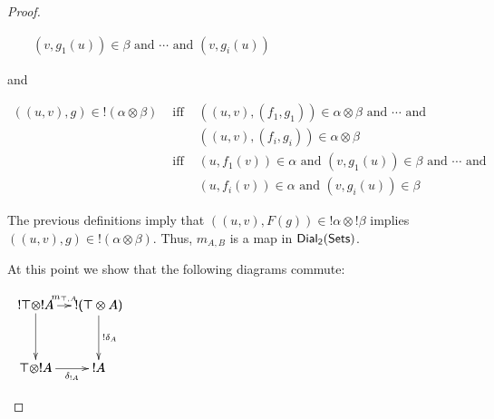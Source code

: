 \begin{proof}
\begin{center}
\begin{itemize}
\begin{center}
\begin{math}
\begin{array}{lll}
            &              & (v,g_1(u)) \in \beta \text{ and } \cdots \text{ and } (v,g_i(u)) 
          \end{array}
        \end{math}
      \end{center}
      and
      \begin{center}
        \begin{math}
          \begin{array}{lll}
            ((u,v),g) \in !(\alpha \otimes \beta) 
            & \text{ iff } & ((u,v),(f_1,g_1)) \in \alpha \otimes \beta \text{ and } \cdots \text{ and } \\
            &              & ((u,v),(f_i,g_i)) \in \alpha \otimes \beta\\
            & \text{ iff } & (u,f_1(v)) \in \alpha \text{ and } (v,g_1(u)) \in \beta \text{ and } \cdots \text{ and } \\
            &              & (u,f_i(v)) \in \alpha \text{ and } (v,g_i(u)) \in \beta
          \end{array}
        \end{math}
      \end{center}
      The previous definitions imply that
      $((u,v),F(g)) \in !\alpha \otimes !\beta$ implies
      $((u,v),g) \in !(\alpha \otimes \beta)$.  Thus, $m_{A,B}$ is a map in $\mathsf{Dial_2}(\mathsf{Sets})$.
      
      At this point we show that the following diagrams commute:
      \begin{center}
        \begin{math}
          \begin{array}{lll}
            \bfig
            \square[!\top \otimes !A`!(\top \otimes A)`\top \otimes !A`!A;m_{\top,A}``!\delta_A`\delta_{!A}]
            \efig
          \end{array}
        \end{math}
      \end{center}
      


\end{itemize}
\end{center}
\end{proof}
